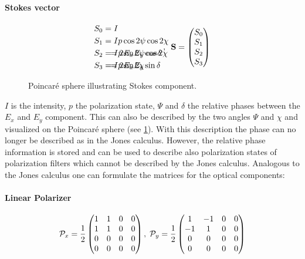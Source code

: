 \paragraph{Stokes vector}
\begin{align}
\begin{split}
S_0 &= I \\
S_1 &= I p \cos 2\psi \cos 2\chi \\
S_2 &= I p \sin 2\psi \cos 2\chi \\
S_3 &= I p \sin 2\chi
\end{split}
% 
\hspace{-7.5em}
% 
\begin{split}
& \\
& \\
&= 2 E_x E_y \cos \delta \\
&= 2 E_x E_y \sin \delta
\end{split}
\: , \enspace
\vec{S} =
\begin{pmatrix} S_0 \\ S_1 \\ S_2 \\ S_3\end{pmatrix}
\end{align}
%
\begin{figure}[!t]
	\centering
	\caption{Poincar\'e sphere illustrating Stokes component.}
	\label{fig:stokesPoincare}
\end{figure}
%
$I$ is the intensity, $p$ the polarization state, $\Psi$ and $\delta$ the relative phases between the $E_x$ and $E_y$ component.
This can also be described by the two angles $\Psi$ and $\chi$ and visualized on the Poincar\'{e} sphere (see \cref{fig:stokesPoincare}).
With this description the phase can no longer be described as in the Jones calculus.
However, the relative phase information is stored and can be used to describe also polarization states of polarization filters which cannot be described by the Jones calculus.
Analogous to the Jones calculus one can formulate the matrices for the optical components:
%
\paragraph{Linear Polarizer}
\begin{align}
\mathcal{P}_x=\frac{1}{2}
\begin{pmatrix}
    1 & 1 & 0 & 0 \\
    1 & 1 & 0 & 0 \\
    0 & 0 & 0 & 0 \\
    0 & 0 & 0 & 0
  \end{pmatrix}
, \;
\mathcal{P}_y=\frac{1}{2}
\begin{pmatrix}
     1 & -1 & 0 & 0 \\
    -1 &  1 & 0 & 0 \\
     0 &  0 & 0 & 0 \\
     0 &  0 & 0 & 0
\end{pmatrix}
\end{align}
%
